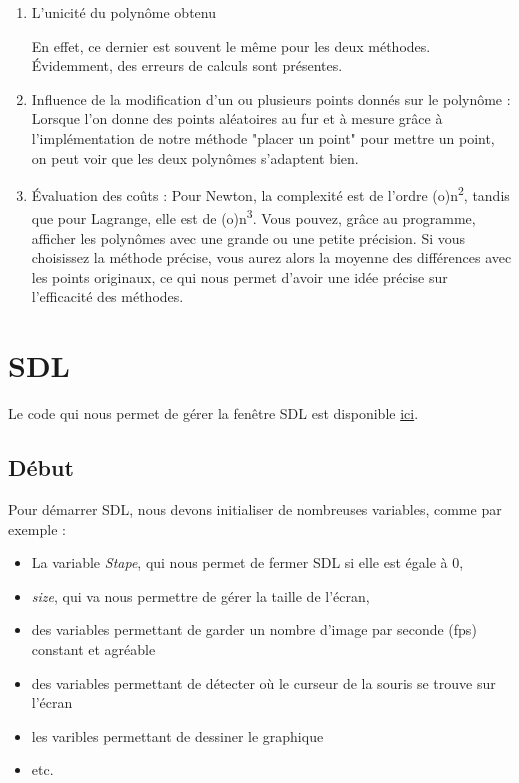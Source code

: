 \documentclass[letter]{article}
\begin{document}
\begin{enumerate}
\item L'unicité du polynôme obtenu

En effet, ce dernier est souvent le même pour les deux méthodes. Évidemment, des erreurs de calculs sont présentes.

\item Influence de la modification d'un ou plusieurs points donnés sur le polynôme :
Lorsque l'on donne des points aléatoires au fur et à mesure grâce à l'implémentation de notre méthode "placer un point" pour mettre un point, on peut voir que les deux polynômes s'adaptent bien.

\item Évaluation des coûts :
Pour Newton, la complexité est de l'ordre (o)n\textsuperscript{2}, tandis que pour Lagrange, elle est de (o)n\textsuperscript{3}. 
Vous pouvez, grâce au programme, afficher les polynômes avec une grande ou une petite précision. Si vous choisissez la méthode précise, vous aurez alors la moyenne des différences avec les points originaux, ce qui nous permet d'avoir une idée précise sur l’efficacité des méthodes.
\end{enumerate}

\newpage
\section{SDL}
\label{sec:org0b99c45}

Le code qui nous permet de gérer la fenêtre SDL est disponible \href{render.c}{ici}.

\subsection{Début}
\label{sec:org0e5987c}

Pour démarrer SDL, nous devons initialiser de nombreuses variables, comme par exemple :

\begin{itemize}
\item La variable \emph{Stape}, qui nous permet de fermer SDL si elle est égale à 0,
\item \emph{size}, qui va nous permettre de gérer la taille de l'écran,
\item des variables permettant de garder un nombre d'image par seconde (fps) constant et agréable
\item des variables permettant de détecter où le curseur de la souris se trouve sur l'écran
\item les varibles permettant de dessiner le graphique
\item etc.
\end{itemize}
\end{document}
